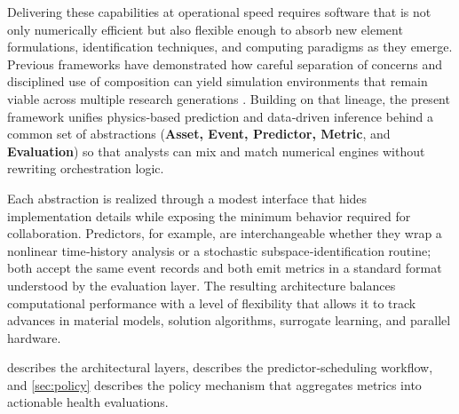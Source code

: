 Delivering these capabilities at operational speed requires software
that is not only numerically efficient but also flexible enough to
absorb new element formulations, identification techniques, and
computing paradigms as they emerge. 
Previous frameworks have demonstrated how careful separation of concerns and disciplined use of
composition can yield simulation environments that remain viable across
multiple research generations \citep{mckenna1997object,scott2004software}. 
Building on that lineage, the present
framework unifies physics‑based prediction and data‑driven inference
behind a common set of abstractions (\textbf{Asset, Event, Predictor,
Metric}, and \textbf{Evaluation}) so that analysts can mix and match
numerical engines without rewriting orchestration logic.

Each abstraction is realized through a modest interface that hides
implementation details while exposing the minimum behavior required for
collaboration. 
Predictors, for example, are interchangeable whether they
wrap a nonlinear time‑history analysis or a stochastic
subspace‑identification routine; both accept the same event records and
both emit metrics in a standard format understood by the evaluation
layer. 
The resulting architecture balances computational performance
with a level of flexibility that allows it to track advances in material
models, solution algorithms, surrogate learning, and parallel hardware.

 describes the architectural layers, 
 describes the
predictor‑scheduling workflow, and \cref{sec:policy} describes the policy mechanism that aggregates metrics into actionable health evaluations.
